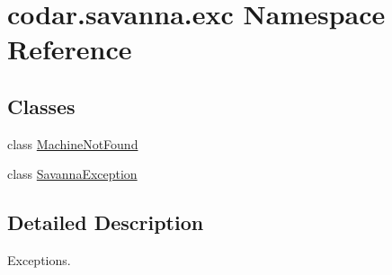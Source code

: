 \hypertarget{namespacecodar_1_1savanna_1_1exc}{}\section{codar.\+savanna.\+exc Namespace Reference}
\label{namespacecodar_1_1savanna_1_1exc}
\subsection*{Classes}
\begin{DoxyCompactItemize}
\item 
class \hyperlink{classcodar_1_1savanna_1_1exc_1_1_machine_not_found}{Machine\+Not\+Found}
\item 
class \hyperlink{classcodar_1_1savanna_1_1exc_1_1_savanna_exception}{Savanna\+Exception}
\end{DoxyCompactItemize}


\subsection{Detailed Description}
\begin{DoxyVerb}Exceptions.
\end{DoxyVerb}
 